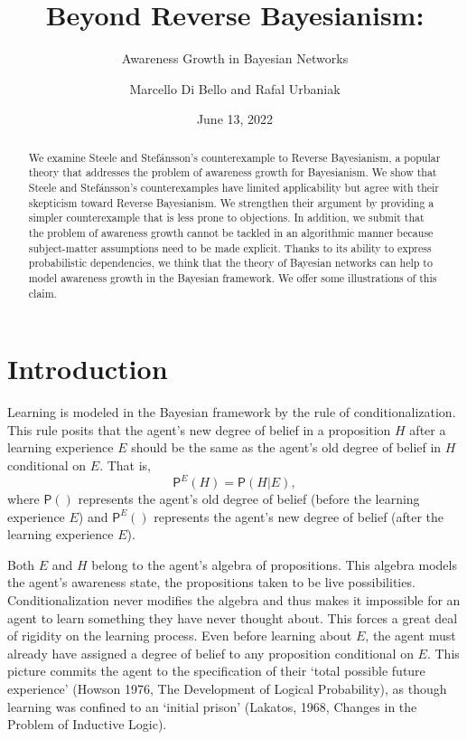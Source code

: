 \documentclass[
  11pt,
  dvipsnames,enabledeprecatedfontcommands]{scrartcl}
\title{Beyond Reverse Bayesianism:}
\subtitle{Awareness Growth in Bayesian Networks}
\author{Marcello Di Bello and Rafal Urbaniak}
\date{June 13, 2022}
\newcommand{\pr}[1]{\ensuremath{\mathsf{P}(#1)}}
\newcommand{\ppr}[2]{\ensuremath{\mathsf{P}^{#1}(#2)}}
\begin{document}
\maketitle

\begin{abstract}
We examine Steele and Stefánsson's counterexample to Reverse Bayesianism, a popular theory 
that addresses the problem of awareness growth for Bayesianism. We show that Steele and Stefánsson's counterexamples have limited applicability but agree with their skepticism toward Reverse Bayesianism. We strengthen their argument by providing a simpler counterexample that is less prone to objections. In addition, we submit that the problem of awareness growth cannot be tackled in an algorithmic manner because subject-matter assumptions need to be made explicit. Thanks to its ability to express probabilistic dependencies, we think that the theory of Bayesian networks can help to model awareness growth in the Bayesian framework. We offer some illustrations of this claim.
\end{abstract}

\hypertarget{introduction}{%
\section{Introduction}\label{introduction}}

Learning is modeled in the Bayesian framework by the rule of
conditionalization. This rule posits that the agent's new degree of
belief in a proposition \(H\) after a learning experience \(E\) should
be the same as the agent's old degree of belief in \(H\) conditional on
\(E\). That is, \[\ppr{E}{H}=\pr{H \vert E},\] where \(\pr{}\)
represents the agent's old degree of belief (before the learning
experience \(E\)) and \(\ppr{E}{}\) represents the agent's new degree of
belief (after the learning experience \(E\)).

Both \(E\) and \(H\) belong to the agent's algebra of propositions. This
algebra models the agent's awareness state, the propositions taken to be
live possibilities. Conditionalization never modifies the algebra and
thus makes it impossible for an agent to learn something they have never
thought about. This forces a great deal of rigidity on the learning
process. Even before learning about \(E\), the agent must already have
assigned a degree of belief to any proposition conditional on \(E\).
This picture commits the agent to the specification of their `total
possible future experience' (Howson 1976, The Development of Logical
Probability), as though learning was confined to an `initial prison'
(Lakatos, 1968, Changes in the Problem of Inductive Logic).
\end{document}
